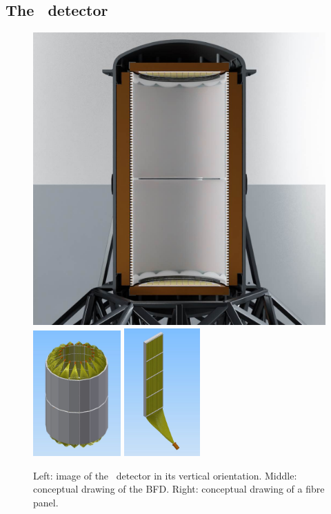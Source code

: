 \subsection{The \NHD\ detector}
\label{sec.hd}

\begin{figure}[htbp!]
\centering
    \includegraphics[width=0.42\linewidth]{img2/cut_detector.jpg}
    \includegraphics[width=0.30\textwidth]{img2/Fiber23D.jpg}
    \includegraphics[width=0.26\textwidth]{img2/FiberPanel.jpg}
     \caption{\small Left: image of the \NHD\ detector in its vertical orientation. Middle: conceptual drawing of the BFD. 
     Right: conceptual drawing of  a fibre panel.}
     \label{fig.NHD}
\end{figure}


